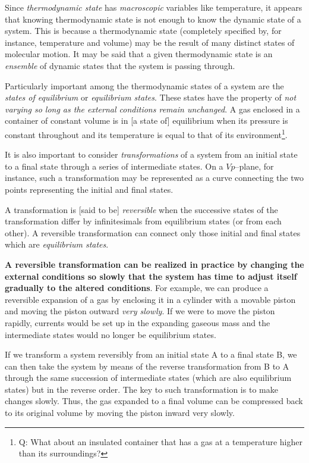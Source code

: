 \documentclass[11pt]{article}         %
\begin{document}
Since \emph{thermodynamic state} has \emph{macroscopic} variables like temperature, it appears that knowing thermodynamic state is not enough to know the dynamic state of a system. This is because a thermodynamic state (completely specified by, for instance, temperature and volume) may be the result of many distinct states of molecular motion. It may be said that a given thermodynamic state is an \emph{ensemble} of dynamic states that the system is passing through.

Particularly important among the thermodynamic states of a system are the \emph{states of equilibrium} or \emph{equilibrium states}. These states have the property of \emph{not varying so long as the external conditions remain unchanged}. A gas enclosed in a container of constant volume is in [a state of] equilibrium when its pressure is constant throughout and its temperature is equal to that of its environment\footnote{Q: What about an insulated container that has a gas at a temperature higher than its surroundings?}.

It is also important to consider \emph{transformations} of a system from an initial state to a final state through a series of intermediate states. On a $Vp$--plane, for instance, such a transformation may be represented as a curve connecting the two points representing the initial and final states. 

A transformation is [said to be] \emph{reversible} when the successive states of the transformation differ by infinitesimals from equilibrium states (or from each other). A reversible transformation can connect only those initial and final states which are \emph{equilibrium states}. 

\textbf{A reversible transformation can be realized in practice by changing the external conditions so slowly that the system has time to adjust itself gradually to the altered conditions}. For example, we can produce a reversible expansion of a gas by enclosing it in a cylinder with a movable piston and moving the piston outward \emph{very slowly}. If we were to move the piston rapidly, currents would be set up in the expanding gaseous mass and the intermediate states would no longer be equilibrium states.

If we transform a system reversibly from an initial state A to a final state B, we can then take the system by means of the reverse transformation from B to A through the same succession of intermediate states (which are also equilibrium states) but in the reverse order. The key to such transformation is to make changes slowly. Thus, the gas expanded to a final volume can be compressed back to its original volume by moving the piston inward very slowly.
\end{document}
